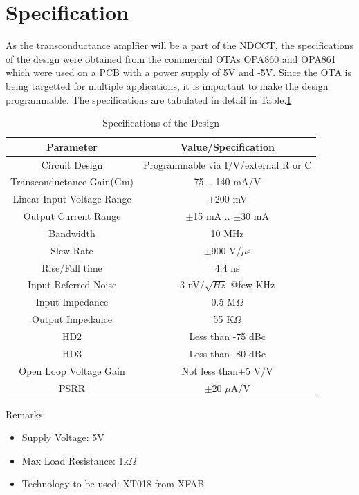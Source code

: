 \vfill
\clearpage

\section{Specification}
As the transconductance amplfier will be a part of the NDCCT, the specifications of the design were obtained from the commercial OTAs OPA860 and OPA861 which were used on a PCB with a power supply of 5V and -5V. Since the OTA is being targetted for multiple applications, it is important to make the design programmable. The specifications are tabulated in detail in Table.\ref{tab:Specs}

\begin{table} [H]
\centering
\begin{tabular}{@{}cc@{}}
\toprule
Parameter						& Value/Specification		\\ \midrule
Circuit Design					& Programmable via I/V/external R or C			\\
Transconductance Gain(Gm)		& 75 .. 140 mA/V			\\
Linear Input Voltage Range		& $\pm$200 mV				\\
Output Current Range			& $\pm$15 mA .. $\pm$30 mA	\\
Bandwidth						& 10 MHz					\\
Slew Rate						& $\pm$900 V/$\mu$s			\\
Rise/Fall time					& 4.4 ns					\\
Input Referred Noise			& 3 nV/$\sqrt{Hz}$ @few KHz	\\
Input Impedance					& 0.5 M$\Omega$				\\
Output Impedance				& 55 K$\Omega$				\\
HD2								& Less than -75 dBc			\\
HD3								& Less than -80 dBc			\\
Open Loop Voltage Gain			& Not less than+5 V/V		\\
PSRR							& $\pm$20 $\mu$A/V			\\
\bottomrule
\end{tabular}
\caption{Specifications of the Design}
\label{tab:Specs}
\end{table}

Remarks:
\begin{itemize}
\item Supply Voltage: 5V
\item Max Load Resistance: 1k$\Omega$
\item Technology to be used: XT018 from XFAB
\end{itemize}

